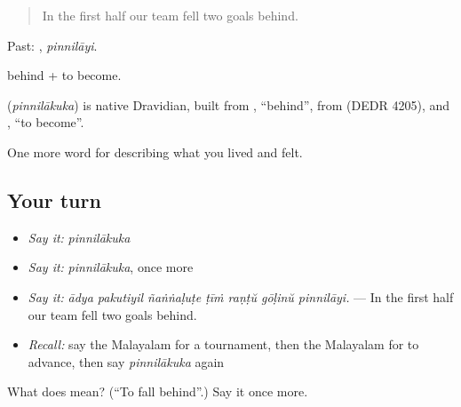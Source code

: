 \begin{quote}
In the first half our team fell two goals behind.
\end{quote}

Past: , \emph{pinnilāyi}.

 behind +  to become.

\begin{cousinweb}
\textbf{} (\emph{pinnilākuka}) is native Dravidian, built from , \textquotedblleft{}behind\textquotedblright{}, from  (DEDR 4205), and , \textquotedblleft{}to become\textquotedblright{}.
\end{cousinweb}

\begin{grammarlens}[title={What you've built}]
One more word for describing what you lived and felt.
\end{grammarlens}

\subsection*{Your turn}
\begin{itemize}
\raggedright
  \item \emph{Say it:} \emph{pinnilākuka}
  \item \emph{Say it:} \emph{pinnilākuka}, once more
  \item \emph{Say it:} \emph{ādya pakutiyil ñaṅṅaḷuṭe ṭīṁ raṇṭŭ gōḷinŭ pinnilāyi.} — In the first half our team fell two goals behind.
  \item \emph{Recall:} say the Malayalam for a tournament, then the Malayalam for to advance, then say \emph{pinnilākuka} again
\end{itemize}

\begin{tcolorbox}[breakable,colback=teal!4,colframe=teal!35!black,title={Before you move on}]
What does  mean? (\textquotedblleft{}To fall behind\textquotedblright{}.) Say it once more.
\end{tcolorbox}
